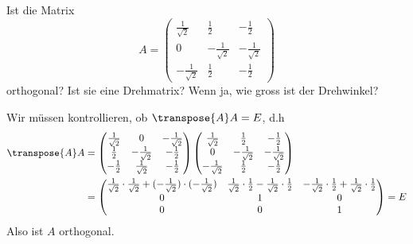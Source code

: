 Ist die Matrix
\[
A=
\begin{pmatrix}
\frac1{\sqrt{2}}&\frac12&-\frac12\\
0&-\frac1{\sqrt{2}}&-\frac1{\sqrt{2}}\\
-\frac1{\sqrt{2}}&\frac12&-\frac12
\end{pmatrix}
\]
orthogonal? Ist sie eine Drehmatrix?  Wenn ja, wie gross ist der Drehwinkel?


\begin{loesung}
Wir müssen kontrollieren, ob $\transpose{A}A=E$, d.h
\begin{align*}
\transpose{A}A&=
\begin{pmatrix}
\frac1{\sqrt{2}}&0&-\frac1{\sqrt{2}}\\
\frac12&-\frac1{\sqrt{2}}&-\frac12\\
-\frac12&\frac1{\sqrt{2}}&-\frac12
\end{pmatrix}
\begin{pmatrix}
\frac1{\sqrt{2}}&\frac12&-\frac12\\
0&-\frac1{\sqrt{2}}&-\frac1{\sqrt{2}}\\
-\frac1{\sqrt{2}}&\frac12&-\frac12
\end{pmatrix}
\\
&=
\begin{pmatrix}
\frac1{\sqrt{2}}\cdot\frac1{\sqrt{2}} + (-\frac1{\sqrt{2}})\cdot(-\frac1{\sqrt{2}})
        &\frac1{\sqrt{2}}\cdot\frac12-\frac1{\sqrt{2}}\cdot\frac12
                &-\frac1{\sqrt{2}}\cdot\frac12+\frac1{\sqrt{2}}\cdot\frac12\\
0&1&0\\
0&0&1
\end{pmatrix}=E
\end{align*}
Also ist $A$ orthogonal.


\end{loesung}
